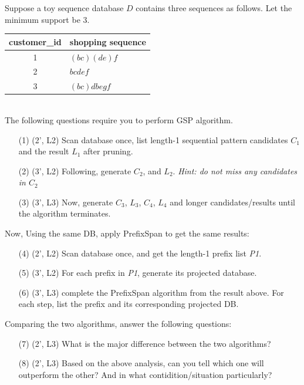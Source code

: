 \documentclass[12pt,letterpaper]{article}
\begin{document}
				Suppose a toy sequence database $D$ contains three sequences as follows. Let the minimum support be 3.
				
				\begin{tabular}{c|l}
					customer\_id & shopping sequence \\\hline
					1 & $(bc) (de) f$ \\
					2 & $ bc d ef$ \\
					3 & $(bc) d b e g f$ \\\hline
				\end{tabular}\\
				
				The following questions require you to perform GSP algorithm.
				
				\begin{enumerate}
					\item [(1)] (2', L2) Scan database once, list length-1 sequential pattern candidates $C_1$ and the result $L_1$ after pruning. 
					\item [(2)] (3', L2) Following, generate $C_2$, and $L_2$. \textit{Hint: do not miss any candidates in $C_2$}
					\item [(3)] (3', L3) Now, generate $C_3$, $L_3$, $C_4$, $L_4$ and longer candidates/results until the algorithm terminates.
				\end{enumerate}
				
				Now, Using the same DB, apply PrefixSpan to get the same results:\\
				
				\begin{enumerate}
					\item [(4)] (2', L2) Scan database once, and get the length-1 prefix list \textit{P1}. 
					\item [(5)] (3', L2) For each prefix in \textit{P1}, generate its projected database.
					\item [(6)] (3', L3) complete the PrefixSpan algorithm from the result above. For each step, list the prefix and its corresponding projected DB.
				\end{enumerate}
				
				Comparing the two algorithms, answer the following questions:
				
				\begin{enumerate}
					\item [(7)] (2', L3) What is the major difference between the two algorithms?
					\item [(8)] (2', L3) Based on the above analysis, can you tell which one will outperform the other? And in what contidition/situation particularly?
				\end{enumerate}
				
\end{document}
